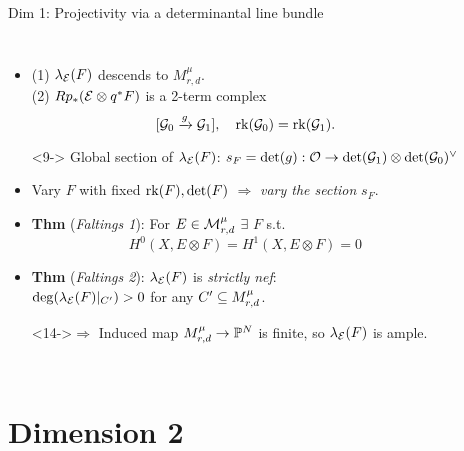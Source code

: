 \documentclass[8pt,handout]{beamer} %
\begin{document}
\begin{frame}[fragile]{Dim 1: Projectivity via a determinantal line bundle}
\begin{columns}[t]
    \begin{itemize}
        \item<8-> (1) $\lambda_{\mathcal{E}}(F)$ descends to $M^\mu_{r,d}$. \\ (2) $R p_* (\mathcal{E} \otimes q^*F)$ is a 2-term complex
        \[ [\mathcal{G}_0 \xrightarrow{g} \mathcal{G}_1], \quad \operatorname{\mathrm{rk}}(\mathcal{G}_0) = \operatorname{\mathrm{rk}}(\mathcal{G}_1). \]
        \item[]<9-> Global section of $\lambda_{\mathcal{E}}(F)$: $s_F = \det(g): \mathcal{O} \to \det(\mathcal{G}_1) \otimes \det(\mathcal{G}_0)^\vee$
        \item<10-> Vary $F$ with fixed $\operatorname{\mathrm{rk}}(F), \det(F)$ $\Rightarrow$ \textit{vary the section} $s_F$.
        \item<11-> \textbf{Thm} (\textit{Faltings 1}): For $E \in \mathcal{M}^\mu_{r,d}$ $\exists$ $F$ s.t.
        \[ H^0(X, E \otimes F) = H^1(X, E \otimes F) = 0 \]
        \item<13-> \textbf{Thm} (\textit{Faltings 2}): $\lambda_{\mathcal{E}}(F)$ is \textit{strictly nef}: \\
        $\deg(\lambda_{\mathcal{E}}(F)|_{C'}) > 0$ for any $C' \subseteq M^\mu_{r,d}$.
        \item[]<14->$\Rightarrow$ Induced map $M^\mu_{r,d} \to \mathbb{P}^N$ is finite, so $\lambda_{\mathcal{E}}(F)$ is ample.
    \end{itemize}
\end{columns}
\end{frame}

\section{Dimension 2}
\end{document}
